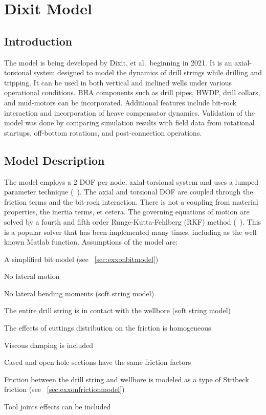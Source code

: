 \chapter{Dixit Model}
\label{ch:exxonmobilmodel}

\section{Introduction}
The model is being developed by Dixit, et al.\ beginning in 2021.  It is an axial-torsional system designed to model the dynamics of drill strings while drilling and tripping. It can be used in both vertical and inclined wells under various operational conditions.  BHA components such as drill pipes, HWDP, drill collars, and mud-motors can be incorporated.  Additional features include bit-rock interaction and incorporation of heave compensator dynamics. Validation of the model was done by comparing simulation results with field data from rotational startups, off-bottom rotations, and post-connection operations.

\section{Model Description}
The model employs a 2 DOF per node, axial-torsional system and uses a lumped-parameter technique (~\cite{ref:dixit2021a}). The axial and torsional DOF are coupled through the friction terms and the bit-rock interaction.  There is not a coupling from material properties, the inertia terms, et cetera.  The governing equations of motion are solved by a fourth and fifth order Runge-Kutta-Fehlberg (RKF) method (~\cite{ref:shor2022a}).  This is a popular solver that has been implemented many times, including as the well known Matlab  function. Assumptions of the model are:
\begin{bulletedlist}
	\item A simplified bit model (see \sectionname~\ref{sec:exxonbitmodel})
	\item No lateral motion
    \item No lateral bending moments (soft string model)
    \item The entire drill string is in contact with the wellbore (soft string model)
	\item The effects of cuttings distribution on the friction is homogeneous
	\item Viscous damping is included
	\item Cased and open hole sections have the same friction factors
    \item Friction between the drill string and wellbore is modeled as a type of Stribeck friction (see \sectionname~\ref{sec:exxonfrictionmodel})
    \item Tool joints effects can be included
\end{bulletedlist}

